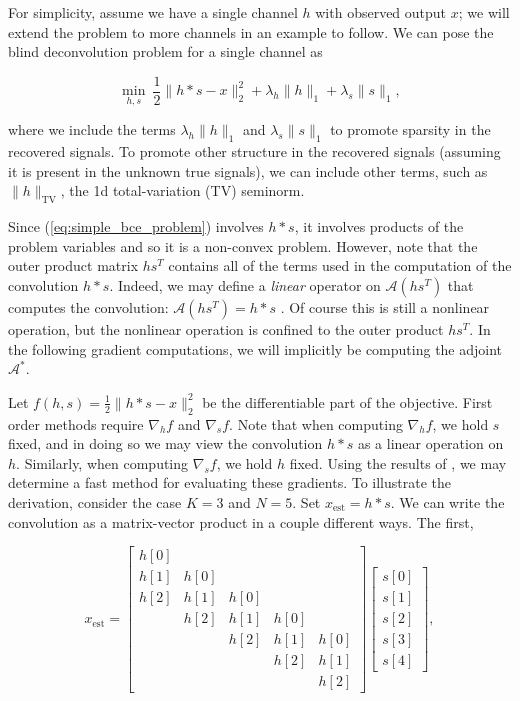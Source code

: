 \documentclass[journal]{IEEEtran}
\begin{document}
For simplicity, assume we have a single channel $h$ with observed output $x$; we will extend the problem to more channels in an example to follow.  We can pose the blind deconvolution problem for a single channel as

\begin{equation}
\label{eq:simple_bce_problem}
\min_{h,s}~ \frac{1}{2}\|h\ast s-x\|_2^2 + \lambda_h\|h\|_1 + \lambda_s \|s\|_1,
\end{equation}

\noindent where we include the terms $\lambda_h\|h\|_1$ and $\lambda_s\|s\|_1$ to promote sparsity in the recovered signals.  To promote other structure in the recovered signals (assuming it is present in the unknown true signals), we can include other terms, such as $\|h\|_\text{TV}$, the 1d total-variation (TV) seminorm.

Since (\ref{eq:simple_bce_problem}) involves $h\ast s$, it involves products of the problem variables and so it is a non-convex problem.  However, note that the outer product matrix $hs^T$ contains all of the terms used in the computation of the convolution $h\ast s$.  Indeed, we may define a \emph{linear} operator on $\mathcal{A}(hs^T)$ that computes the convolution: $\mathcal{A}(hs^T)=h\ast s$ \cite{ahmed_2013}.  Of course this is still a nonlinear operation, but the nonlinear operation is confined to the outer product $hs^T$.  In the following gradient computations, we will implicitly be computing the adjoint $\mathcal{A}^\ast$.

Let $f(h,s)=\frac{1}{2}\|h\ast s -x\|_2^2$ be the differentiable part of the objective.  First order methods require $\nabla_hf$ and $\nabla_sf$.  Note that when computing $\nabla_hf$, we hold $s$ fixed, and in doing so we may view the convolution $h\ast s$ as a linear operation on $h$.  Similarly, when computing $\nabla_s f$, we hold $h$ fixed.  Using the results of \cite{claerbout_1992}, we may determine a fast method for evaluating these gradients.  To illustrate the derivation, consider the case $K=3$ and $N=5$.  Set $x_\text{est}=h\ast s$.  We can write the convolution as a matrix-vector product in a couple different ways.  The first,

\[ x_\text{est} = \begin{bmatrix} h[0]\\h[1]&h[0]\\h[2]&h[1]&h[0]\\&h[2]&h[1]&h[0]\\&&h[2]&h[1]&h[0]\\&&&h[2]&h[1]\\&&&&h[2]\end{bmatrix}\begin{bmatrix}s[0]\\s[1]\\s[2]\\s[3]\\s[4]\end{bmatrix}, \] 
\end{document}
